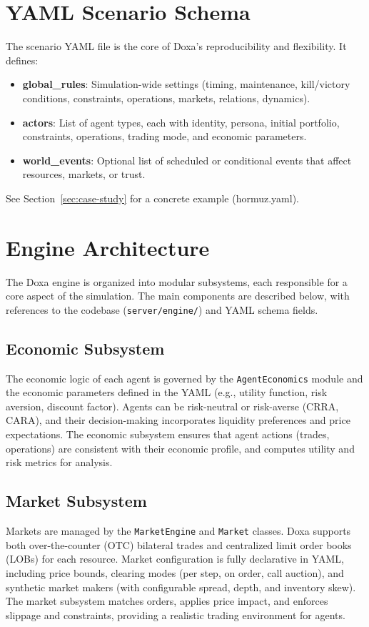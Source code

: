 \documentclass{article}
\begin{document}
\section{YAML Scenario Schema}
\label{sec:schema}
The scenario YAML file is the core of Doxa's reproducibility and flexibility. It defines:
\begin{itemize}
    \item \textbf{global\_rules}: Simulation-wide settings (timing, maintenance, kill/victory conditions, constraints, operations, markets, relations, dynamics).
    \item \textbf{actors}: List of agent types, each with identity, persona, initial portfolio, constraints, operations, trading mode, and economic parameters.
    \item \textbf{world\_events}: Optional list of scheduled or conditional events that affect resources, markets, or trust.
\end{itemize}
See Section~\ref{sec:case-study} for a concrete example (hormuz.yaml).

\section{Engine Architecture}
\label{sec:engine}

The Doxa engine is organized into modular subsystems, each responsible for a core aspect of the simulation. The main components are described below, with references to the codebase (\texttt{server/engine/}) and YAML schema fields.

\subsection{Economic Subsystem}
The economic logic of each agent is governed by the \texttt{AgentEconomics} module and the economic parameters defined in the YAML (e.g., utility function, risk aversion, discount factor). Agents can be risk-neutral or risk-averse (CRRA, CARA), and their decision-making incorporates liquidity preferences and price expectations. The economic subsystem ensures that agent actions (trades, operations) are consistent with their economic profile, and computes utility and risk metrics for analysis.

\subsection{Market Subsystem}
Markets are managed by the \texttt{MarketEngine} and \texttt{Market} classes. Doxa supports both over-the-counter (OTC) bilateral trades and centralized limit order books (LOBs) for each resource. Market configuration is fully declarative in YAML, including price bounds, clearing modes (per step, on order, call auction), and synthetic market makers (with configurable spread, depth, and inventory skew). The market subsystem matches orders, applies price impact, and enforces slippage and constraints, providing a realistic trading environment for agents.
\end{document}

